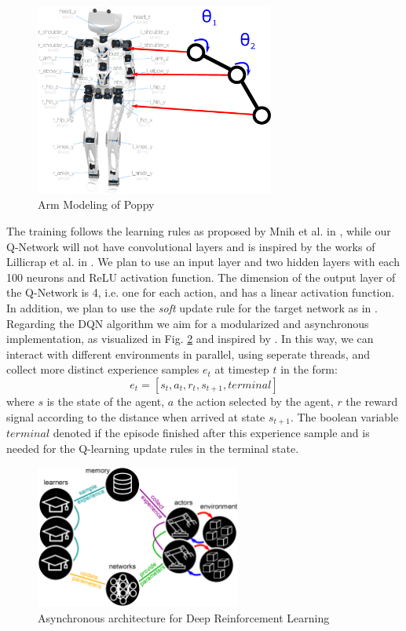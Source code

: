 \documentclass[a4paper,twoside, openright,12pt]{report}
\begin{document}
\begin{figure}
	\centering
	\includegraphics[width=0.7\textwidth]{reportpics/poppy_2dof.eps}
	\caption{Arm Modeling of Poppy}
	\label{fig:poppy_2dof}
\end{figure}

The training follows the learning rules as proposed by Mnih et al. in \cite{mnih2013playing, mnih2015human}, while our Q-Network will not have convolutional layers and is inspired by the works of Lillicrap et al. in \cite{lillicrap2015continuous}. We plan to use an input layer and two hidden layers with each 100 neurons and ReLU activation function. The dimension of the output layer of the Q-Network is 4, i.e. one for each action, and has a linear activation function. In addition, we plan to use the \textit{soft} update rule for the target network as in \cite{lillicrap2015continuous}. Regarding the \ac{DQN} algorithm we aim for a modularized and asynchronous implementation, as visualized in Fig. \ref{fig:async} and inspired by \cite{nair2015massively, mnih2016asynchronous}. In this way, we can interact with different environments in parallel, using seperate threads, and collect more distinct experience samples $e_t$ at timestep $t$ in the form:
\begin{equation}
e_t = [s_t, a_t, r_t, s_{t+1}, terminal]
\end{equation} 
where $s$ is the state of the agent, $a$ the action selected by the agent, $r$ the reward signal according to the distance when arrived at state $s_{t+1}$. The boolean variable $terminal$ denoted if the episode finished after this experience sample and is needed for the Q-learning update rules in the terminal state. \\

\begin{figure}
	\centering
	\includegraphics[width=0.6\textwidth]{reportpics/async_e.eps}
	\caption{Asynchronous architecture for Deep Reinforcement Learning}
	\label{fig:async}
\end{figure}
\end{document}
